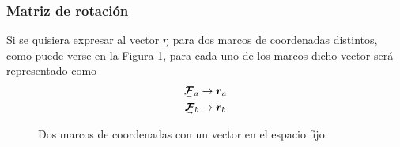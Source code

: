 \subsubsection{Matriz de rotación}
Si se quisiera expresar al vector $\undervec{r}$ para dos marcos de coordenadas distintos, como puede verse en la Figura \ref{fig:rotatedcoordinateframes}, para cada uno de los marcos dicho vector será representado como
\begin{align}
    \undervec{\bm{\mathcal{F}}}_a &\rightarrow \bm{r}_a \\
    \undervec{\bm{\mathcal{F}}}_b &\rightarrow \bm{r}_b
\end{align}

\begin{figure}
    \centering
    
    \caption{Dos marcos de coordenadas con un vector en el espacio fijo}
    \label{fig:rotatedcoordinateframes}
\end{figure}


